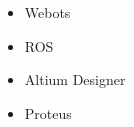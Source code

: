 \documentclass[10pt,a4paper,sans]{moderncv} %
\begin{document}
\begin{cvcolumns}
{\begin{itemize}[nosep]
\begin{itemize}[nosep]
					    \item Robotics System Toolbox
					    \item ROS Toolbox
					    \item Simscape
					    \item Simulink 3D Animation
					\end{itemize}
					\item Webots
					\item ROS
				\end{itemize}
		}
		{
			\vspace{-0.5em}
				\begin{itemize}[nosep]
					\item Altium Designer
					\item Proteus
				\end{itemize}
		}
	\end{cvcolumns} 
	
	\vspace{-1em}
	
\end{document}
